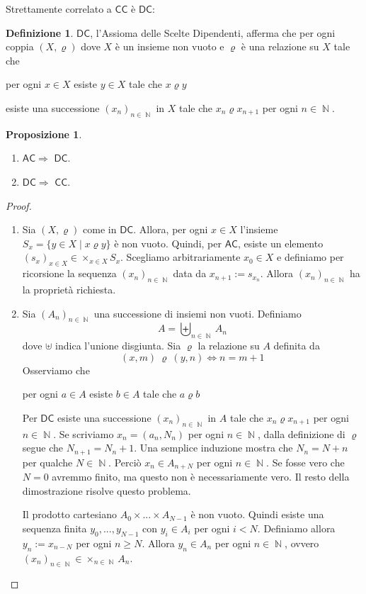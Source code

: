 \documentclass[12pt,a4paper]{report}
\theoremstyle{definition}
\newtheorem{defn}[teo]{Definizione}  %
\newtheorem{prop}[teo]{Proposizione}  %
\theoremstyle{num.custom-title}
\DeclareMathOperator{\N}{\mathbb{N}}
\newcommand{\AC}{\ensuremath{\mathsf{AC}}\xspace}
\newcommand{\CC}{\ensuremath{\mathsf{CC}}\xspace}
\newcommand{\DC}{\ensuremath{\mathsf{DC}}\xspace}
\begin{document}
Strettamente correlato a \CC è \DC:

\begin{defn}
\DC, l'Assioma delle Scelte Dipendenti, afferma che per ogni coppia $(X,\varrho)$ dove $X$ è un insieme non vuoto e $\varrho$ è una relazione su $X$ tale che 
\begin{center}
per ogni $x \in X$ esiste $y \in X$ tale che $x \varrho y$
\end{center}
esiste una successione $(x_n)_{n \in \N}$ in $X$ tale che $x_n \varrho x_{n+1}$ per ogni $n \in \N$.
\end{defn}

\begin{prop}\ 
\begin{enumerate}
\item \AC $\Rightarrow$ \DC.
\item \DC $\Rightarrow$ \CC.
\end{enumerate}
\begin{proof}
\begin{enumerate}
\item Sia $(X,\varrho)$ come in \DC. Allora, per ogni $x \in X$ l'insieme $S_x=\{y \in X \mid x \varrho y\}$ è non vuoto. Quindi, per \AC, esiste un elemento $(s_x)_{x \in X} \in \times_{x \in X} S_x$. Scegliamo arbitrariamente $x_0 \in X$ e definiamo per ricorsione la sequenza $(x_n)_{n \in \N}$ data da $x_{n+1}:=s_{x_n}$. Allora $(x_n)_{n \in \N}$ ha la proprietà richiesta.
\item Sia $(A_n)_{n \in \N}$ una successione di insiemi non vuoti. Definiamo
\[
A = \biguplus_{n \in \N} A_n
\]
dove $\uplus$ indica l'unione disgiunta. Sia $\varrho$ la relazione su $A$ definita da
\[
(x,m) \ \varrho \ (y,n) \iff n=m+1
\]
Osserviamo che 
\begin{center}
per ogni $a \in A$ esiste $b \in A$ tale che $a \varrho b$
\end{center}
Per \DC esiste una successione $(x_n)_{n \in \N}$ in $A$ tale che $x_n \varrho x_{n+1}$ per ogni $n \in \N$. Se scriviamo $x_n = (a_n, N_n)$ per ogni $n \in \N$, dalla definizione di $\varrho$ segue che $N_{n+1} = N_n + 1$. Una semplice induzione mostra che $N_n = N+n$ per qualche $N \in \N$. Perciò $x_n \in A_{n+N}$ per ogni $n \in \N$. Se fosse vero che $N=0$ avremmo finito, ma questo non è necessariamente vero. Il resto della dimostrazione risolve questo problema.

Il prodotto cartesiano $A_0 \times ... \times A_{N-1}$ è non vuoto. Quindi esiste una sequenza finita $y_0,...,y_{N-1}$ con $y_i \in A_i$ per ogni $i<N$. Definiamo allora $y_n:=x_{n-N}$ per ogni $n \geq N$. Allora $y_n \in A_n$ per ogni $n \in \N$, ovvero $(x_n)_{n \in \N} \in \times_{n \in \N} A_n$.
\end{enumerate}
\end{proof}
\end{prop}
\end{document}
